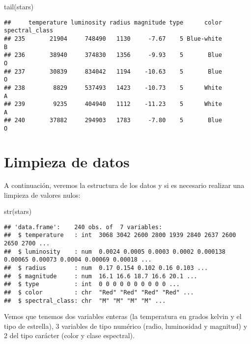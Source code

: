 \documentclass[
]{article}
\newenvironment{Shaded}{\begin{snugshade}}{\end{snugshade}}
\newcommand{\FunctionTok}[1]{\textcolor[rgb]{0.94,0.94,0.56}{#1}}
\newcommand{\NormalTok}[1]{\textcolor[rgb]{0.80,0.80,0.80}{#1}}
\begin{document}
\begin{Shaded}
\begin{Highlighting}[]
\FunctionTok{tail}\NormalTok{(stars)}
\end{Highlighting}
\end{Shaded}

\begin{verbatim}
##     temperature luminosity radius magnitude type      color spectral_class
## 235       21904     748490   1130     -7.67    5 Blue-white              B
## 236       38940     374830   1356     -9.93    5       Blue              O
## 237       30839     834042   1194    -10.63    5       Blue              O
## 238        8829     537493   1423    -10.73    5      White              A
## 239        9235     404940   1112    -11.23    5      White              A
## 240       37882     294903   1783     -7.80    5       Blue              O
\end{verbatim}

\hypertarget{limpieza-de-datos}{%
\section{Limpieza de datos}\label{limpieza-de-datos}}

A continuación, veremos la estructura de los datos y si es necesario
realizar una limpieza de valores nulos:

\begin{Shaded}
\begin{Highlighting}[]
\FunctionTok{str}\NormalTok{(stars)}
\end{Highlighting}
\end{Shaded}

\begin{verbatim}
## 'data.frame':    240 obs. of  7 variables:
##  $ temperature   : int  3068 3042 2600 2800 1939 2840 2637 2600 2650 2700 ...
##  $ luminosity    : num  0.0024 0.0005 0.0003 0.0002 0.000138 0.00065 0.00073 0.0004 0.00069 0.00018 ...
##  $ radius        : num  0.17 0.154 0.102 0.16 0.103 ...
##  $ magnitude     : num  16.1 16.6 18.7 16.6 20.1 ...
##  $ type          : int  0 0 0 0 0 0 0 0 0 0 ...
##  $ color         : chr  "Red" "Red" "Red" "Red" ...
##  $ spectral_class: chr  "M" "M" "M" "M" ...
\end{verbatim}

Vemos que tenemos dos variables enteras (la temperatura en grados kelvin
y el tipo de estrella), 3 variables de tipo numérico (radio, luminosidad
y magnitud) y 2 del tipo carácter (color y clase espectral).
\end{document}
